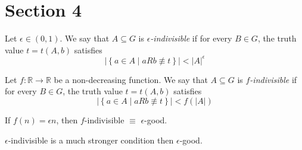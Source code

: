 \section{Section 4} \label{sec:section_4}


    \label{def:epsilon_indivisible}
    Let $\epsilon \in (0,1)$.
    We say that $A \subseteq G$ is \emph{$\epsilon$-indivisible} if for every $B \in G$, the truth value $t = t(A,b)$ satisfies
    \[
        |\left\{ a\in A \mid a R b \not\equiv t \right\}| < |A|^{\epsilon}
    \]

    \label{def:f_indivisible}
    Let $f: \mathbb{R} \longrightarrow \mathbb{R}$ be a non-decreasing function.
    We say that $A \subseteq G$ is \emph{$f$-indivisible} if for every $B \in G$, the truth value $t = t(A,b)$ satisfies
    \[
        |\left\{ a\in A \mid a R b \not\equiv t \right\}| < f(|A|)
    \]


    \remark
        If $f(n) = \epsilon n$, then $f$-indivisible $\equiv$ $\epsilon$-good.

    \remark
    $\epsilon$-indivisible is a much stronger condition then $\epsilon$-good.

